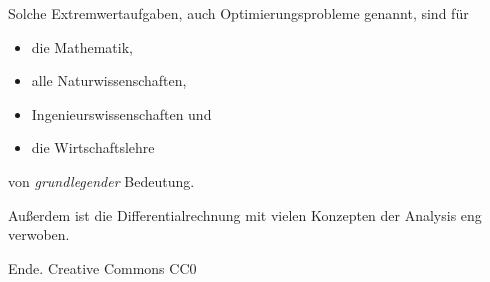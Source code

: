 \documentclass{beamer}
\newcommand{\modest}[1]{{\small\color{gray}#1}}
\begin{document}
\begin{frame}
Solche Extremwertaufgaben, auch Optimierungsprobleme genannt,
sind für
\begin{itemize}
\item die Mathematik,
\item alle Naturwissenschaften,
\item Ingenieurswissenschaften und
\item die Wirtschaftslehre
\end{itemize}
von \emph{grundlegender} Bedeutung.
\end{frame}

\begin{frame}
Außerdem ist die Differentialrechnung mit vielen Konzepten der
Analysis eng verwoben.
\end{frame}

\begin{frame}
Ende.
\vfill\hfill
\modest{Creative Commons CC0}
\end{frame}
\end{document}
